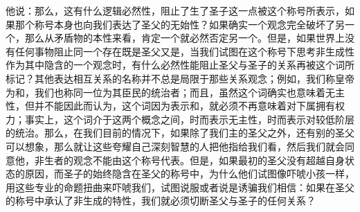 他说：那么，这有什么逻辑必然性，阻止了生了圣子这一点被这个称号所表示，如果那个称号本身也向我们表达了圣父的无始性？如果确实一个观念完全破坏了另一个，那么从矛盾物的本性来看，肯定一个就必然否定另一个。但是，如果世界上没有任何事物阻止同一个存在既是圣父又是，当我们试图在这个称号下思考非生成性作为其中隐含的一个观念时，有什么必然性能阻止圣父与圣子的关系再被这个词所标记？其他表达相互关系的名称并不总是局限于那些关系观念；例如，我们称皇帝为和，我们也称同一位为其臣民的统治者；而且，虽然这个词确实也意味着无主性，但并不能因此而认为，这个词因为表示和，就必须不再意味着对下属拥有权力；事实上，这个词介于这两个概念之间，时而表示无主性，时而表示对较低阶层的统治。那么，在我们目前的情况下，如果除了我们主的圣父之外，还有别的圣父可以想象，那么就让这些夸耀自己深刻智慧的人把他指给我们看，然后我们就会同意他，非生者的观念不能由这个称号代表。但是，如果最初的圣父没有超越自身状态的原因，而圣子的始终隐含在圣父的称号中，为什么他们试图像吓唬小孩一样，用这些专业的命题扭曲来吓唬我们，试图说服或者说是诱骗我们相信：如果在圣父的称号中承认了非生成的特性，我们就必须切断圣父与圣子的任何关系？\par

